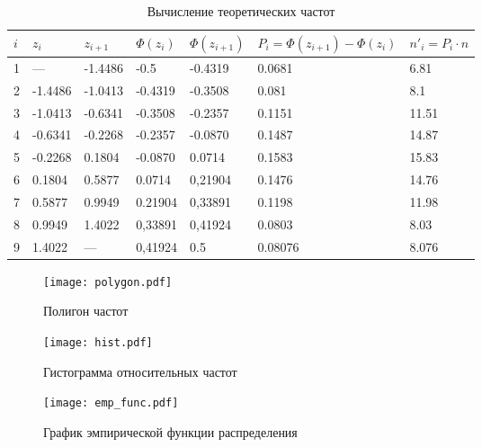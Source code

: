 \documentclass{article}
\theoremstyle{problemstyle}
\begin{document}
\begin{table}[ht]
  \centering
  \begin{tabular}{|l||l|l||l|l||l|l|}
    \hline
    \(i\) & \(z_i\) & \(z_{i+1}\) & 
    \(\Phi(z_i)\) & \(\Phi(z_{i+1})\) &
    \(P_i = \Phi(z_{i+1}) - \Phi(z_i)\) &
    \(n'_i = P_i \cdot n\)
    \\
    \hline
    1 & ---     & -1.4486 & -0.5    & -0.4319 & 0.0681 & 6.81 \\
    \hline
    2 & -1.4486 & -1.0413 & -0.4319 & -0.3508 & 0.081 & 8.1 \\
    \hline
    3 & -1.0413 & -0.6341 & -0.3508 & -0.2357 & 0.1151 & 11.51 \\
    \hline
    4 & -0.6341 & -0.2268 & -0.2357 & -0.0870 & 0.1487 & 14.87 \\
    \hline
    5 & -0.2268 & 0.1804  & -0.0870 & 0.0714  & 0.1583 & 15.83 \\
    \hline
    6 & 0.1804  & 0.5877  & 0.0714  & 0,21904 & 0.1476 & 14.76 \\
    \hline
    7 & 0.5877  & 0.9949  & 0.21904 & 0,33891 & 0.1198 & 11.98 \\
    \hline
    8 & 0.9949  & 1.4022  & 0,33891 & 0,41924 & 0.0803 & 8.03  \\
    \hline
    9 & 1.4022  & ---     & 0,41924 & 0.5     & 0.08076 & 8.076\\
    \hline
  \end{tabular}
  \caption{Вычисление теоретических частот}\label{table:theoretical}
\end{table}





\begin{figure}[ht]
  \centering
  \texttt{[image: polygon.pdf]}
  \caption{Полигон частот}\label{fig:polygon}
\end{figure}

\begin{figure}[ht]
  \centering
  \texttt{[image: hist.pdf]}
  \caption{Гистограмма относительных частот}\label{fig:hist}
\end{figure}

\begin{figure}[ht]
  \centering
  \texttt{[image: emp\_func.pdf]}
  \caption{График эмпирической функции распределения}\label{fig:emp_func}
\end{figure}

\newpage
\end{document}

